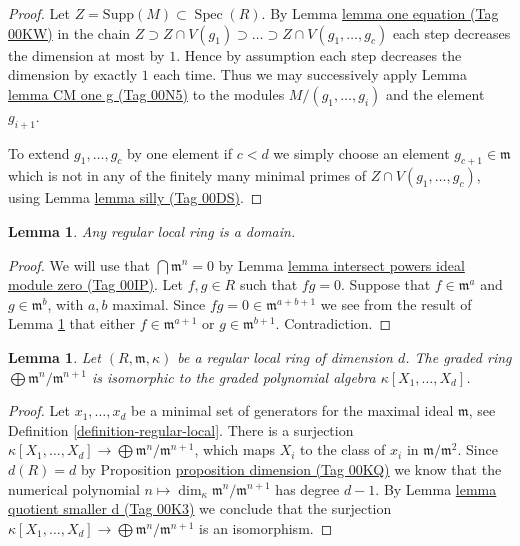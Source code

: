 \documentclass{amsart}
\theoremstyle{plain}
\newtheorem{lemma}[subsection]{Lemma}
\theoremstyle{definition}
\theoremstyle{remark}
\numberwithin{equation}{subsection}
\def\Spec{\mathop{\mathrm{Spec}}}
\begin{document}
\begin{proof}
Let $Z = \text{Supp}(M) \subset \Spec(R)$.
By Lemma \href{https://stacks.math.columbia.edu/tag/00KW}{lemma one equation (Tag 00KW)} in the chain
$Z \supset Z \cap V(g_1) \supset \ldots \supset Z \cap V(g_1, \ldots, g_c)$
each step decreases the dimension at most by $1$. Hence by assumption
each step decreases the dimension by exactly $1$ each time. Thus we
may successively apply Lemma \href{https://stacks.math.columbia.edu/tag/00N5}{lemma CM one g (Tag 00N5)} to the modules
$M/(g_1, \ldots, g_i)$ and the element $g_{i + 1}$.

\medskip\noindent
To extend $g_1, \ldots, g_c$ by one element if $c < d$ we simply
choose an element $g_{c + 1} \in \mathfrak m$ which is not
in any of the finitely many minimal primes of $Z \cap V(g_1, \ldots, g_c)$,
using Lemma \href{https://stacks.math.columbia.edu/tag/00DS}{lemma silly (Tag 00DS)}.
\end{proof}


\begin{lemma}
\label{lemma-regular-domain}
Any regular local ring is a domain.
\end{lemma}

\begin{proof}
We will use that $\bigcap \mathfrak m^n = 0$
by Lemma \href{https://stacks.math.columbia.edu/tag/00IP}{lemma intersect powers ideal module zero (Tag 00IP)}.
Let $f, g \in R$ such that $fg = 0$.
Suppose that $f \in \mathfrak m^a$ and
$g \in \mathfrak m^b$, with $a, b$ maximal.
Since $fg = 0 \in \mathfrak m^{a + b + 1}$
we see from the result of Lemma \ref{lemma-regular-graded}
that either $f \in \mathfrak m^{a + 1}$ or
$g \in \mathfrak m^{b + 1}$. Contradiction.
\end{proof}


\begin{lemma}
\label{lemma-regular-graded}
Let $(R, \mathfrak m, \kappa)$ be a regular local ring of dimension $d$.
The graded ring $\bigoplus \mathfrak m^n / \mathfrak m^{n + 1}$
is isomorphic to the graded polynomial algebra
$\kappa[X_1, \ldots, X_d]$.
\end{lemma}

\begin{proof}
Let $x_1, \ldots, x_d$ be a minimal set of generators
for the maximal ideal $\mathfrak m$, see
Definition \ref{definition-regular-local}.
There is a surjection $\kappa[X_1, \ldots, X_d]
\to \bigoplus \mathfrak m^n/\mathfrak m^{n + 1}$,
which maps $X_i$ to the class of $x_i$ in $\mathfrak m/\mathfrak m^2$.
Since $d(R) = d$ by
Proposition \href{https://stacks.math.columbia.edu/tag/00KQ}{proposition dimension (Tag 00KQ)}
we know that the numerical
polynomial $n \mapsto \dim_\kappa \mathfrak m^n/\mathfrak m^{n + 1}$
has degree $d - 1$. By Lemma \href{https://stacks.math.columbia.edu/tag/00K3}{lemma quotient smaller d (Tag 00K3)} we
conclude that the surjection $\kappa[X_1, \ldots, X_d]
\to \bigoplus \mathfrak m^n/\mathfrak m^{n + 1}$ is an isomorphism.
\end{proof}
\end{document}
